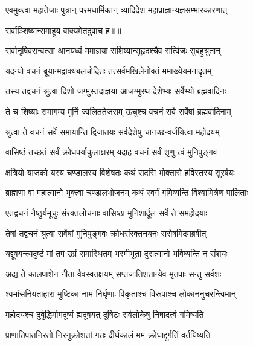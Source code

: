 \twolineshloka
{एवमुक्त्वा महातेजाः पुत्रान् परमधार्मिकान्}
{व्यादिदेश महाप्राज्ञान्यज्ञसम्भारकारणात्} %

{सर्वाञ्शिष्यान्समाहूय वाक्यमेतदुवाच ह॥॥} %

\addtocounter{shlokacount}{1}

\twolineshloka
{सर्वानृषिवरान्वत्सा आनयध्वं ममाज्ञया}
{सशिष्यान्सुहृदश्चैव सर्त्विजः सुबहुश्रुतान्} %

\twolineshloka
{यदन्यो वचनं ब्रूयान्मद्वाक्यबलचोदितः}
{तत्सर्वमखिलेनोक्तं ममाख्येयमनादृतम्} %

\twolineshloka
{तस्य तद्वचनं श्रुत्वा दिशो जग्मुस्तदाज्ञया}
{आजग्मुरथ देशेभ्यः सर्वेभ्यो ब्रह्मवादिनः} %

\twolineshloka
{ते च शिष्याः समागम्य मुनिं ज्वलिततेजसम्}
{ऊचुश्च वचनं सर्वे सर्वेषां ब्रह्मवादिनाम्} %

\twolineshloka
{श्रुत्वा ते वचनं सर्वे समायान्ति द्विजातयः}
{सर्वदेशेषु चागच्छन्वर्जयित्वा महोदयम्} %

\twolineshloka
{वासिष्ठं तच्छतं सर्वं क्रोधपर्याकुलाक्षरम्}
{यदाह वचनं सर्वं शृणु त्वं मुनिपुङ्गव} %

\twolineshloka
{क्षत्रियो याजको यस्य चण्डालस्य विशेषतः}
{कथं सदसि भोक्तारो हविस्तस्य सुरर्षयः} %

\twolineshloka
{ब्राह्मणा वा महात्मानो भुक्त्वा चण्डालभोजनम्}
{कथं स्वर्गं गमिष्यन्ति विश्वामित्रेण पालिताः} %

\twolineshloka
{एतद्वचनं नैष्ठुर्यमूचुः संरक्तलोचनाः}
{वासिष्ठा मुनिशार्दूल सर्वे ते समहोदयाः} %

\twolineshloka
{तेषां तद्वचनं श्रुत्वा सर्वेषां मुनिपुङ्गवः}
{क्रोधसंरक्तनयनः सरोषमिदमब्रवीत्} %

\twolineshloka
{यद्दूषयन्त्यदुष्टं मां तप उग्रं समास्थितम्}
{भस्मीभूता दुरात्मानो भविष्यन्ति न संशयः} %

\twolineshloka
{अद्य ते कालपाशेन नीता वैवस्वतक्षयम्}
{सप्तजातिशतान्येव मृतपाः सन्तु सर्वशः} %

\twolineshloka
{श्वमांसनियताहारा मुष्टिका नाम निर्घृणाः}
{विकृताश्च विरूपाश्च लोकाननुचरन्त्विमान्} %

\twolineshloka
{महोदयश्च दुर्बुद्धिर्मामदूष्यं ह्यदूषयत्}
{दूषिटः सर्वलोकेषु निषादत्वं गमिष्यति} %

\twolineshloka
{प्राणातिपातनिरतो निरनुक्रोशतां गतः}
{दीर्घकालं मम क्रोधाद्दुर्गतिं वर्तयिष्यति} %

